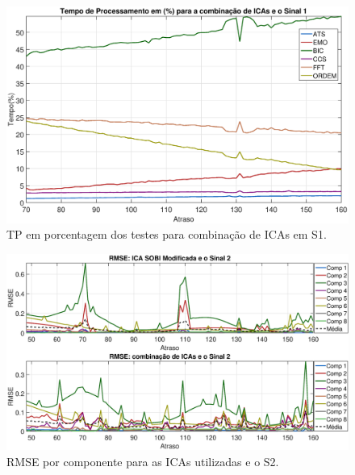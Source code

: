 \documentclass[a4paper,12pt]{monografia}
\theoremstyle{plain}
\theoremstyle{definition}
\theoremstyle{remark}
\begin{document}
\begin{figure}[!htb]
    \begin{center}
    \advance\leftskip -1.5cm
    \includegraphics[scale=0.45]{imagens/ImagensParaOAnexo/TPPACombinacaoICASinal1.eps}
    \caption{TP em porcentagem dos testes para combinação de ICAs em S1.}
    \label{fig:TPCIAS1}    
    \end{center}
\end{figure}

\begin{figure}[!htb]
    \begin{center}
    \advance\leftskip -1.5cm
    \includegraphics[scale=0.45]{imagens/ImagensParaOAnexo/RMSEcompATodasICAsSinal2.eps}
    \caption{RMSE por componente para as ICAs utilizadas e o S2.}
    \label{fig:RMSEAS2}    
    \end{center}
\end{figure}
\end{document}
